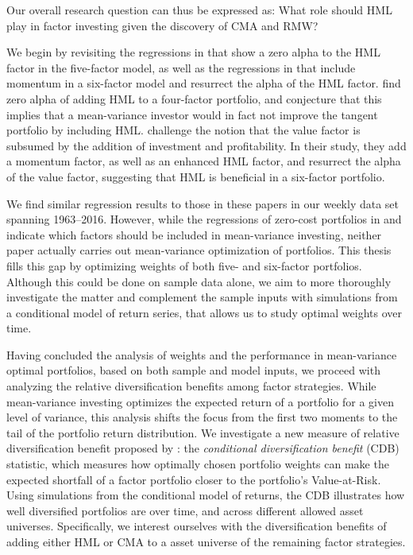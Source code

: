 Our overall research question can thus be expressed as: What role should HML play in factor investing given the discovery of CMA and RMW?

We begin by revisiting the regressions in \textcite{FF2015} that show a zero alpha to the HML factor in the five-factor model, as well as the regressions in \textcite{Asness2015} that include momentum in a six-factor model and resurrect the alpha of the HML factor. \textcite{FF2015} find zero alpha of adding HML to a four-factor portfolio, and conjecture that this implies that a mean-variance investor would in fact not improve the tangent portfolio by including HML. \textcite{Asness2015} challenge the notion that the value factor is subsumed by the addition of investment and profitability. In their study, they add a momentum factor, as well as an enhanced HML factor, and resurrect the alpha of the value factor, suggesting that HML is beneficial in a six-factor portfolio.

We find similar regression results to those in these papers in our weekly data set spanning 1963--2016. However, while the regressions of zero-cost portfolios in \textcite{FF2015} and \textcite{Asness2015} indicate which factors should be included in mean-variance investing, neither paper actually carries out mean-variance optimization of portfolios. This thesis fills this gap by optimizing weights of both five- and six-factor portfolios. Although this could be done on sample data alone, we aim to more thoroughly investigate the matter and complement the sample inputs with simulations from a conditional model of return series, that allows us to study optimal weights over time.

Having concluded the analysis of weights and the performance in mean-variance optimal portfolios, based on both sample and model inputs, we proceed with analyzing the relative diversification benefits among factor strategies. While mean-variance investing optimizes the expected return of a portfolio for a given level of variance, this analysis shifts the focus from the first two moments to the tail of the portfolio return distribution. We investigate a new measure of relative diversification benefit proposed by \textcite{ChristoffersenErrunzaJacobLanglois2012}: the \emph{conditional diversification benefit} (CDB) statistic, which measures how optimally chosen portfolio weights can make the expected shortfall of a factor portfolio closer to the portfolio's Value-at-Risk. Using simulations from the conditional model of returns, the CDB illustrates how well diversified portfolios are over time, and across different allowed asset universes. Specifically, we interest ourselves with the diversification benefits of adding either HML or CMA to a asset universe of the remaining factor strategies.

